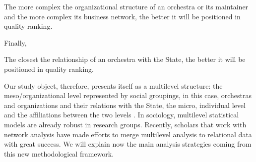 \documentclass[a4paper, 12pt, openright, oneside, german, french, brazil, english, article]{abntex2}
\begin{document}
		
	\begin{hip}
		The more complex the organizational structure of an orchestra or its maintainer and the more complex its business network, the better it will be positioned in quality ranking.
	\end{hip}
	
	Finally,
	
	\begin{hip}
	The closest the relationship of an orchestra with the State, the better it will be positioned in quality ranking.
	\end{hip}
	
	

	Our study object, therefore, presents itself as a multilevel structure: the meso/organizational level represented by social groupings, in this case, orchestras and organizations and their relations with the State, the micro, individual level and the affiliations between the two levels \cite{brailly2016market,eloire2009reseaux,lazega2008catching,favre2016inter}. In sociology, multilevel statistical models are already robust in research groups. Recently, scholars that work with network analysis have made efforts to merge multilevel analysis to relational data with great success. We will explain now the main analysis strategies coming from this new methodological framework.
	
\end{document}
